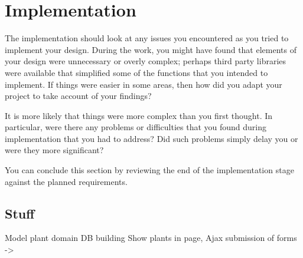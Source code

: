 \chapter{Implementation}

The implementation should look at any issues you encountered as you tried to implement your design. During the work, you might have found that elements of your design were unnecessary or overly complex; perhaps third party libraries were available that simplified some of the functions that you intended to implement. If things were easier in some areas, then how did you adapt your project to take account of your findings?

It is more likely that things were more complex than you first thought. In particular, were there any problems or difficulties that you found during implementation that you had to address? Did such problems simply delay you or were they more significant? 

You can conclude this section by reviewing the end of the implementation stage against the planned requirements. 


\section{Stuff}

Model plant domain
DB building
Show plants in page, 
Ajax submission of forms -> 